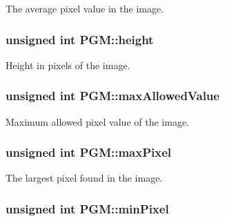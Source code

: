 The average pixel value in the image. 

\hypertarget{class_p_g_m_a84af85a78cdb18c3f4e40c9668e5144f}{}
\subsubsection[{height}]{\setlength{\rightskip}{0pt plus 5cm}unsigned int P\+G\+M\+::height\hspace{0.3cm}{\ttfamily [private]}}\label{class_p_g_m_a84af85a78cdb18c3f4e40c9668e5144f}


Height in pixels of the image. 

\hypertarget{class_p_g_m_a33ac46eb1f698bc6f6d4efec8440c6b7}{}
\subsubsection[{max\+Allowed\+Value}]{\setlength{\rightskip}{0pt plus 5cm}unsigned int P\+G\+M\+::max\+Allowed\+Value\hspace{0.3cm}{\ttfamily [private]}}\label{class_p_g_m_a33ac46eb1f698bc6f6d4efec8440c6b7}


Maximum allowed pixel value of the image. 

\hypertarget{class_p_g_m_a5bc3b9f648daf505e5c8e86286c9a40f}{}
\subsubsection[{max\+Pixel}]{\setlength{\rightskip}{0pt plus 5cm}unsigned int P\+G\+M\+::max\+Pixel\hspace{0.3cm}{\ttfamily [private]}}\label{class_p_g_m_a5bc3b9f648daf505e5c8e86286c9a40f}


The largest pixel found in the image. 

\hypertarget{class_p_g_m_ac40e2ebf0447a03a5bd07a4dc5f32223}{}
\subsubsection[{min\+Pixel}]{\setlength{\rightskip}{0pt plus 5cm}unsigned int P\+G\+M\+::min\+Pixel\hspace{0.3cm}{\ttfamily [private]}}\label{class_p_g_m_ac40e2ebf0447a03a5bd07a4dc5f32223}


